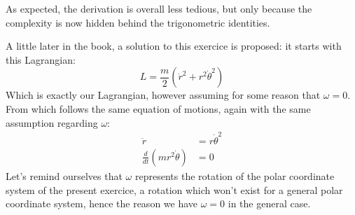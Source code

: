 \documentclass[solutions.tex]{subfiles}
\begin{document}
\begin{remark} As expected, the derivation is overall less tedious,
but only because the complexity is now hidden behind the
trigonometric identities.
\end{remark}
\begin{remark} A little later in the book, a solution to this
exercice is proposed: it starts with this Lagrangian:
\[
	L = \frac{m}{2}\left(\dot{r}^2+r^2\dot\theta^2\right)
\]
Which is exactly our Lagrangian, however assuming for some
reason that $\omega = 0$. From which follows the same equation
of motions, again with the same assumption regarding $\omega$:
\begin{align*}
	\ddot{r} &= r\dot\theta^2 \\
	\frac{d}{dt}\left(mr^2\dot\theta\right) &= 0
\end{align*}
Let's remind ourselves that $\omega$ represents the rotation of the polar
coordinate system of the present exercice, a rotation which won't
exist for a general polar coordinate system, hence the reason we have
$\omega=0$ in the general case.
\end{remark}
\end{document}
